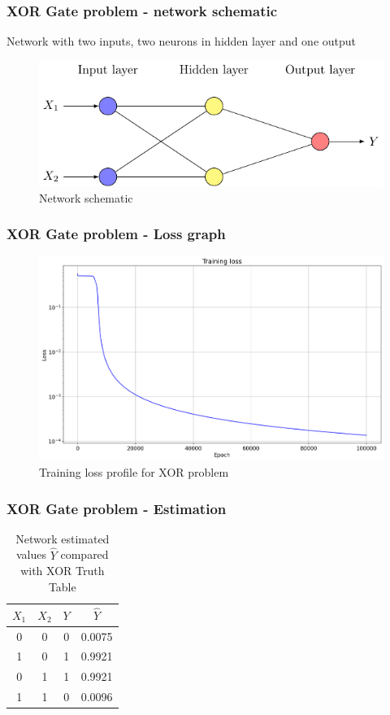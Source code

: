 \begin{frame}
    \frametitle{XOR Gate problem - network schematic}
    Network with two inputs, two neurons in hidden layer and one output
    \vspace{1cm}
    \begin{figure}
        \center
        \includegraphics[scale=1]{supportingFiles/schematics/XOR_problem/XOR_schematic.pdf}
        \caption{Network schematic}
    \end{figure}
\end{frame}

\begin{frame}
    \frametitle{XOR Gate problem - Loss graph}
    \begin{figure}
        \center
        \includegraphics[scale=0.33]{supportingFiles/lossGraphs/loss_XOR.png}
        \caption{Training loss profile for XOR problem}
    \end{figure}
\end{frame}

\begin{frame}
    \frametitle{XOR Gate problem - Estimation}
    \begin{table}
        \caption{Network estimated values $\hat{Y}$ compared with XOR Truth Table}
        \begin{tabular}{cccc}
        \toprule
            $X_1$ & $X_2$ & $Y$ & $\hat{Y}$ \\ \midrule
            0 & 0 & 0 & 0.0075 \\
            1 & 0 & 1 & 0.9921 \\
            0 & 1 & 1 & 0.9921 \\
            1 & 1 & 0 & 0.0096 \\ \bottomrule
        \end{tabular}
    \end{table}
\end{frame}

